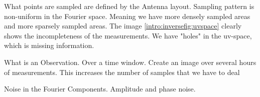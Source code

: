 What points are sampled are defined by the Antenna layout. Sampling pattern is non-uniform in the Fourier space. Meaning we have more densely sampled areas and more sparsely sampled areas. The image \ref{intro:inversefig:uvspace} clearly shows the incompleteness of the measurements. We have "holes" in the uv-space, which is missing information.

What is an Observation. Over a time window. Create an image over several hours of measurements. This increases the number of samples that we have to deal

Noise in the Fourier Components. Amplitude and phase noise. 


\begin{figure}[htp]
	\sbox{}
	\setlength{\twosubht}{\ht\twosubbox}
	

\end{figure}
